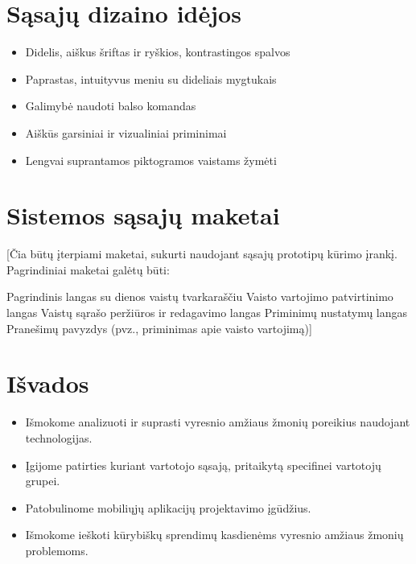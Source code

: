 \documentclass[14pt]{extarticle}
\begin{document}
\section{Sąsajų dizaino idėjos}

\begin{itemize}
	\item Didelis, aiškus šriftas ir ryškios, kontrastingos spalvos
	\item Paprastas, intuityvus meniu su dideliais mygtukais
	\item Galimybė naudoti balso komandas
	\item Aiškūs garsiniai ir vizualiniai priminimai
	\item Lengvai suprantamos piktogramos vaistams žymėti
\end{itemize}

\clearpage

\section{Sistemos sąsajų maketai}

 [Čia būtų įterpiami maketai, sukurti naudojant sąsajų prototipų kūrimo įrankį. Pagrindiniai maketai galėtų būti:

  Pagrindinis langas su dienos vaistų tvarkaraščiu
  Vaisto vartojimo patvirtinimo langas
  Vaistų sąrašo peržiūros ir redagavimo langas
  Priminimų nustatymų langas
  Pranešimų pavyzdys (pvz., priminimas apie vaisto vartojimą)]

\clearpage

\section{Išvados}

\begin{itemize}
	\item Išmokome analizuoti ir suprasti vyresnio amžiaus žmonių poreikius naudojant technologijas.
	\item Įgijome patirties kuriant vartotojo sąsają, pritaikytą specifinei vartotojų grupei.
	\item Patobulinome mobiliųjų aplikacijų projektavimo įgūdžius.
	\item Išmokome ieškoti kūrybiškų sprendimų kasdienėms vyresnio amžiaus žmonių problemoms.
\end{itemize}
\end{document}
